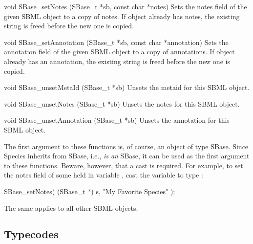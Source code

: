 \documentclass{sbmlmanual}
\begin{document}
\begin{methoddef}{void SBase\_setNotes (SBase\_t *sb, const char *notes)}
  Sets the notes field of the given SBML object to a copy of notes.  If
  object already has notes, the existing string is freed before the new
  one is copied.
\end{methoddef}


\begin{methoddef}{void SBase\_setAnnotation (SBase\_t *sb, const char *annotation)}
  Sets the annotation field of the given SBML object to a copy of
  annotations.  If object already has an annotation, the existing string
  is freed before the new one is copied.
\end{methoddef}


\begin{methoddef}{void SBase\_unsetMetaId (SBase\_t *sb)}
  Unsets the metaid for this SBML object.
\end{methoddef}


\begin{methoddef}{void SBase\_unsetNotes (SBase\_t *sb)}
  Unsets the notes for this SBML object.
\end{methoddef}


\begin{methoddef}{void SBase\_unsetAnnotation (SBase\_t *sb)}
  Unsets the annotation for this SBML object.
\end{methoddef}


The first argument to these functions is, of course, an object of type
SBase.  Since Species inherits from SBase, i.e., 
\emph{is an} SBase, it can be used as the first argument to these
functions.  Beware, however, that a cast is required.  For example, to set
the notes field of some  held in variable , cast
the variable to type :

\begin{example}[c]
SBase_setNotes( (SBase_t *) s, "My Favorite Species" );
\end{example}

The same applies to all other SBML objects.


\subsection{Typecodes}
\label{sec:typecodes}
\end{document}

